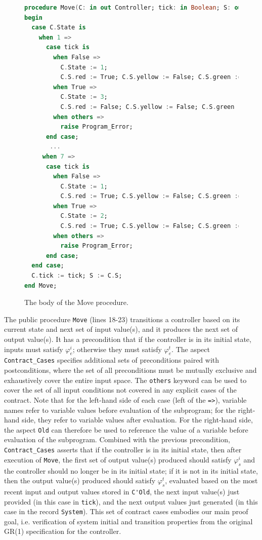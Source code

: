 \documentclass[runningheads]{llncs}
\begin{document}
\begin{figure}
\begin{lstlisting}[language={Ada}, basicstyle=\scriptsize]  
procedure Move(C: in out Controller; tick: in Boolean; S: out System) is
begin
  case C.State is
    when 1 =>
      case tick is
        when False =>
          C.State := 1; 
          C.S.red := True; C.S.yellow := False; C.S.green := False;
        when True =>
          C.State := 3; 
          C.S.red := False; C.S.yellow := False; C.S.green := True;
        when others =>
          raise Program_Error;
      end case;
       ...      
     when 7 =>
      case tick is
        when False =>
          C.State := 1; 
          C.S.red := True; C.S.yellow := False; C.S.green := False;
        when True => 
          C.State := 2; 
          C.S.red := True; C.S.yellow := False; C.S.green := False;
        when others =>
          raise Program_Error;
      end case;
  end case;
  C.tick := tick; S := C.S;
end Move;
\end{lstlisting}
  \caption{The body of the Move procedure.}
  \label{fig:moveBody}
\end{figure}

The public procedure \lstinline{Move} (lines 18-23) transitions a controller based on its current state and 
next set of input value(s), and it produces the next set of output value(s). 
It has a precondition that if the controller is in its initial state, 
inputs must satisfy $\varphi_e^i$; otherwise they must satisfy $\varphi_e^t$.
The aspect \lstinline{Contract_Cases} specifies additional sets of preconditions paired with postconditions, 
where the set of all preconditions must be mutually exclusive and exhaustively cover the entire input space.
The \lstinline{others} keyword can be used to cover the set of all input conditions not covered in any explicit cases of the contract. 
Note that for the left-hand side of each case (left of the \lstinline{=>}), variable names refer to variable values before evaluation of the subprogram; 
for the right-hand side, they refer to variable values after evaluation.
For the right-hand side, the aspect \lstinline{Old} can therefore be used to reference the value of a variable before evaluation of the subprogram. 
Combined with the previous precondition, \lstinline{Contract_Cases} asserts that if the controller is in its initial state, then after execution of \lstinline{Move}, 
the first set of output value(s) produced should satisfy $\varphi_s^i$ and the controller should no longer be in its initial state; 
if it is not in its initial state, then the output value(s) produced should satisfy $\varphi_s^t$, 
evaluated based on the most recent input and output values stored in \lstinline{C'Old}, the next input value(s) just provided (in this case in \lstinline{tick}), 
and the next output values just generated (in this case in the record \lstinline{System}). 
This set of contract cases embodies our main proof goal, i.e. verification of system initial and transition properties from the original GR(1) specification for the controller. 
\end{document}

